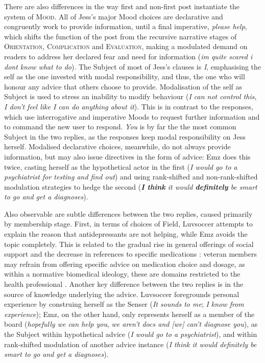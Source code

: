 \documentclass{article}
\renewcommand{\cite}{\parencite}
\begin{document}
There are also differences in the way first and non-first post instantiate the system of \textsc{Mood}. All of Jess's major Mood choices are declarative and congruently work to provide information, until a final imperative, \emph{please help}, which shifts the function of the post from the recursive narrative stages of \textsc{Orientation}, \textsc{Complication} and \textsc{Evaluation}, making a modulated demand on readers to address her declared fear and need for information (\emph{im quite scared i dont know what to do}). The Subject of most of Jess's clauses is \emph{I}, emphasising the self as the one invested with modal responsibility, and thus, the one who will honour any advice that others choose to provide. Modalisation of the self as Subject is used to stress an inability to modify behaviour (\emph{I can not control this}, \emph{I don't feel like I can do anything about it}). This is in contrast to the responses, which use interrogative and imperative Moods to request further information and to command the new user to respond. \emph{You} is by far the the most common Subject in the two replies, as the responses keep modal responsibility on Jess herself. Modalised declarative choices, meanwhile, do not always provide information, but may also issue directives in the form of advice: Emz does this twice, casting herself as the hypothetical actor in the first (\emph{I would go to a psychiatrist for testing and find out}) and using rank-shifted and non-rank-shifted modulation strategies to hedge the second (\emph{\textbf{I think} it would \textbf{definitely} be smart to go and get a diagnoses}).

Also observable are subtle differences between the two replies, caused primarily by membership stage. First, in terms of choices of Field, Luvsoccer attempts to explain the reason that antidepressants are not helping, while Emz avoids the topic completely. This is related to the gradual rise in general offerings of social support and the decrease in references to specific medications \cite{wang_stay_2012}: veteran members may refrain from offering specific advice on medication choice and dosage, as within a normative biomedical ideology, these are domains restricted to the health professional \cite{vayreda_social_2009}. Another key difference between the two replies is in the source of knowledge underlying the advice. Luvsoccer foregrounds personal experience by construing herself as the Senser (\emph{It sounds to me}; \emph{I know from experience}); Emz, on the other hand, only represents herself as a member of the board (\emph{hopefully we can help you}, \emph{we aren't docs and [we] can't diagnose you}), as the Subject within hypothetical advice (\emph{I would go to a psychiatrist}), and within rank-shifted modulation of another advice instance (\emph{I think it would definitely be smart to go and get a diagnoses}). 
\end{document}
